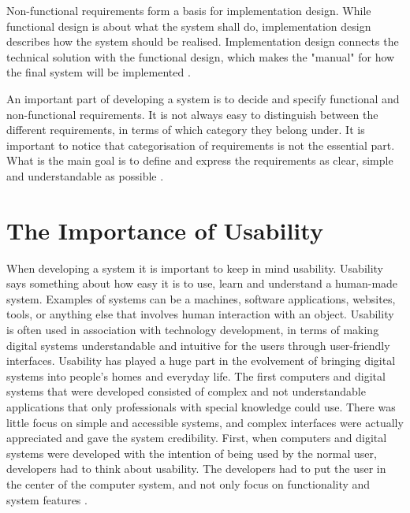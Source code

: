 Non-functional requirements form a basis for implementation design. While functional design is about what the system shall do, implementation design describes how the system should be realised. Implementation design connects the technical solution with the functional design, which makes the "manual" for how the final system will be implemented \cite{systemutviklingDel1}.  

An important part of developing a system is to decide and specify functional and non-functional requirements. It is not always easy to distinguish between the different requirements, in terms of which category they belong under. It is important to notice that categorisation of requirements is not the essential part. What is the main goal is to define and express the requirements as clear, simple and understandable as possible \cite{systemutviklingDel1}.  

\section{The Importance of Usability}
\label{sec:usability}
When developing a system it is important to keep in mind usability. Usability says something about how easy it is to use, learn and understand a human-made system. Examples of systems can be a machines, software applications, websites, tools, or anything else that involves human interaction with an object. Usability is often used in association with technology development, in terms of making digital systems understandable and intuitive for the users through user-friendly interfaces. Usability has played a huge part in the evolvement of bringing digital systems into people's homes and everyday life. The first computers and digital systems that were developed consisted of complex and not understandable applications that only professionals with special knowledge could use. There was little focus on simple and accessible systems, and complex interfaces were actually appreciated and gave the system credibility. First, when computers and digital systems were developed with the intention of being used by the normal user, developers had to think about usability. The developers had to put the user in the center of the computer system, and not only focus on functionality and system features \cite{mmi}.

